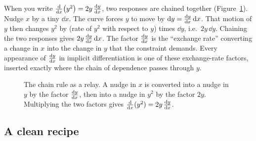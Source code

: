 \begin{happeningbox}
When you write $\frac{\mathrm{d}}{\mathrm{d} x}\!\left(y^2\right) = 2y\,\frac{\mathrm{d} y}{\mathrm{d} x}$, two responses are chained
together (Figure~\ref{ch13:fig-relay}). Nudge $x$ by a tiny $\dd x$. The curve forces $y$ to move by
$\mathrm{d} y = \frac{\mathrm{d} y}{\mathrm{d} x}\,\mathrm{d} x$. That motion of $y$ then changes $y^2$ by (rate of $y^2$ with respect to
$y$) times $\dd y$, i.e.\ $2y\,\dd y$. Chaining the two responses gives $2y\,\frac{\mathrm{d} y}{\mathrm{d} x}\,\mathrm{d} x$. The
factor $\frac{\mathrm{d} y}{\mathrm{d} x}$ is the ``exchange rate'' converting a change in $x$ into the change in $y$ that
the constraint demands. Every appearance of $\frac{\mathrm{d} y}{\mathrm{d} x}$ in implicit differentiation is one of these
exchange-rate factors, inserted exactly where the chain of dependence passes through $y$.
\end{happeningbox}

\begin{figure}[htbp]
\centering
{}
\caption{The chain rule as a relay. A nudge in $x$ is converted into a nudge in $y$ by the factor
$\frac{\mathrm{d} y}{\mathrm{d} x}$, then into a nudge in $y^2$ by the factor $2y$. Multiplying the two factors gives
$\frac{\mathrm{d}}{\mathrm{d} x}(y^2) = 2y\,\frac{\mathrm{d} y}{\mathrm{d} x}$.}
\label{ch13:fig-relay}
\end{figure}

\subsection{A clean recipe}

